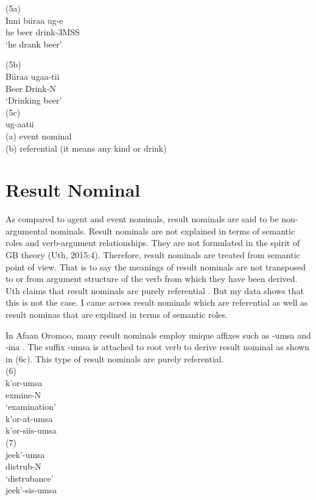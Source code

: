 \documentclass[11pt,a4paper]{article}
\begin{document}
(5a)  \\
\indent Inni 	 biiraa 	ug-e\\
\indent he 	 beer 	drink-3MSS\\
\indent ‘he drank beer’\indent

(5b) 	\\
\indent Biiraa 	ugaa-tii\\
\indent Beer  	Drink-N\\
\indent‘Drinking beer’\\

(5c)\\
\indent	{}ug-aatii\\
\indent (a) event nominal \\
\indent (b) referential (it means any kind or drink)\\

\section{Result Nominal}
As compared to agent and event nominals, result nominals are said to be non-argumental nominals. Result nominals are not explained in terms of semantic roles and verb-argument relationships. They are not formulated in the spirit of GB theory (Uth, 2015:4). Therefore, result nominals are treated from semantic point of view. That is to say the meanings of result nominals are not transposed to or from argument structure of the verb from which they have been derived. Uth claims that result nominals are purely  referential \cite[p-4]{uth2015event}. But my data shows that this is not the case. I came across result nominals which are referential as well as result nominas that are explined in terms of semantic roles. 

In Afaan Oromoo, many result nominals employ unique affixes such as -umsa and -ina \cite{gaddisa2001,temesgen1985,tolemariam2011}. The suffix -umsa is attached to root verb to derive result nominal as shown in (6c). This type of result nominals are purely referential. \\

(6) \\
\indent k'or-umsa\\
\indent exmine-N\\
\indent ‘examination’\\
\indent *k'or-at-umsa\\
\indent *k'or-siis-umsa\\
(7) \\
\indent jeek'-umsa\\
\indent distrub-N\\
\indent ‘distrubance’\\
\indent *jeek'-sis-umsa\\
\end{document}
